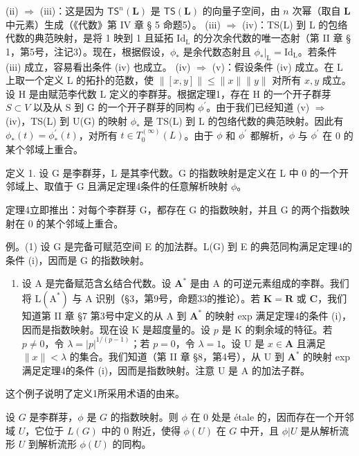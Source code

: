 (ii) \(\Rightarrow\) (iii)：这是因为 \(\mathsf{TS}^n (\mathbf{L})\) 是 \(\mathsf{TS}(\mathbf{L})\) 的向量子空间，由 \(n\) 次幂（取自 \(\mathbf{L}\) 中元素）生成（《代数》第 IV 章 § 5 命题5）。
(iii) \(\Rightarrow\) (iv)：TS(L) 到 L 的包络代数的典范映射，是将 1 映到 1 且延拓 \(\mathrm{Id}_{\mathrm{L}}\) 的分次余代数的唯一态射（第 II 章 § 1，第5号，注记3）。现在，根据假设，\(\phi_{*}\) 是余代数态射且 \(\phi_{*}|_{\mathrm{L}} = \mathrm{Id}_{\mathrm{L}}\)。若条件 (iii) 成立，容易看出条件 (iv) 也成立。
(iv) \(\Rightarrow\) (v)：假设条件 (iv) 成立。在 L 上取一个定义 L 的拓扑的范数，使 \(\| [x,y]\| \leqslant \| x\| \| y\|\) 对所有 \(x,y\) 成立。设 H 是由赋范李代数 L 定义的李群芽。根据定理1，存在 H 的一个开子群芽 \(S\subset V\) 以及从 S 到 G 的一个开子群芽的同构 \(\phi^{\prime}\)。由于我们已经知道 (v) \(\Rightarrow\) (iv)，TS(L) 到 U(G) 的映射 \(\phi_{*}\) 是 TS(L) 到 L 的包络代数的典范映射。因此有 \(\phi_{*}(t) = \phi_{*}^{\prime}(t)\)，对所有 \(t\in T_0^{(\infty)}(L)\)。由于 \(\phi\) 和 \(\phi^{\prime}\) 都解析，\(\phi\) 与 \(\phi^{\prime}\) 在 0 的某个邻域上重合。

定义 1. 设 G 是李群芽，L 是其李代数。G 的指数映射是定义在 L 中 0 的一个开邻域上、取值于 G 且满足定理4条件的任意解析映射 \(\phi\)。

定理4立即推出：对每个李群芽 G，都存在 G 的指数映射，并且 G 的两个指数映射在 0 的某个邻域上重合。

例。(1) 设 G 是完备可赋范空间 E 的加法群。L(G) 到 E 的典范同构满足定理4的条件 (i)，因而是 G 的指数映射。

\begin{enumerate}
\def\labelenumi{(\arabic{enumi})}
\setcounter{enumi}{1}
\tightlist
\item
  设 A 是完备赋范含幺结合代数。设 \(\mathbf{A}^*\) 是由 A 的可逆元素组成的李群。我们将 \(\mathrm{L}(\mathrm{A}^*)\) 与 A 识别（§3，第9号，命题33的推论）。若 \(\mathbf{K} = \mathbf{R}\) 或 \(\mathbf{C}\)，我们知道第 II 章 §7 第3号中定义的从 A 到 \(\mathbf{A}^*\) 的映射 exp 满足定理4的条件 (i)，因而是指数映射。现在设 K 是超度量的。设 \(p\) 是 K 的剩余域的特征。若 \(p \neq 0\)，令 \(\lambda = |p|^{1/(p-1)}\)；若 \(p = 0\)，令 \(\lambda = 1\)。设 U 是 \(x \in \mathbf{A}\) 且满足 \(\|x\| < \lambda\) 的集合。我们知道（第 II 章 §8，第4号），从 U 到 \(\mathbf{A}^*\) 的映射 exp 满足定理4的条件 (i)，因而是指数映射。注意 U 是 A 的加法子群。
\end{enumerate}

这个例子说明了定义1所采用术语的由来。

设 \(G\) 是李群芽，\(\phi\) 是 \(G\) 的指数映射。则 \(\phi\) 在 0 处是 étale 的，因而存在一个开邻域 \(U\)，它位于 \(L(G)\) 中的 0 附近，使得 \(\phi(U)\) 在 \(G\) 中开，且 \(\phi|U\) 是从解析流形 \(U\) 到解析流形 \(\phi(U)\) 的同构。

